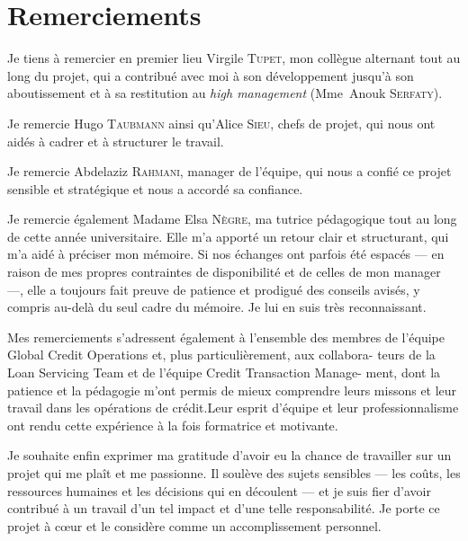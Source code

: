 \section*{Remerciements}

Je tiens à remercier en premier lieu Virgile \textsc{Tupet}, mon collègue
alternant tout au long du projet, qui a contribué avec moi à son développement
jusqu'à son aboutissement et à sa restitution au \textit{high management}
(Mme~Anouk \textsc{Serfaty}).

\bigskip

Je remercie Hugo \textsc{Taubmann} ainsi qu'Alice \textsc{Sieu}, chefs de projet,
qui nous ont aidés à cadrer et à structurer le travail.

\bigskip


Je remercie Abdelaziz \textsc{Rahmani}, manager de l'équipe, qui nous a
confié ce projet sensible et stratégique et nous a accordé sa confiance.

\bigskip

Je remercie également Madame Elsa \textsc{Nègre}, ma tutrice pédagogique tout au
long de cette année universitaire. Elle m'a apporté un retour clair et
structurant, qui m'a aidé à préciser mon mémoire. Si nos échanges ont parfois été
espacés --- en raison de mes propres contraintes de disponibilité et de celles de
mon manager ---, elle a toujours fait preuve de patience et prodigué des conseils
avisés, y compris au-delà du seul cadre du mémoire. Je lui en suis très
reconnaissant.

\bigskip

Mes remerciements s'adressent également à l'ensemble des membres de
l'équipe Global Credit Operations et, plus particulièrement, aux collabora-
teurs de la Loan Servicing Team et de l'équipe Credit Transaction Manage-
ment, dont la patience et la pédagogie m'ont permis de mieux comprendre
leurs missons et leur travail dans les opérations de crédit.Leur esprit d'équipe
et leur professionnalisme ont rendu cette expérience à la fois formatrice et
motivante.

\bigskip

Je souhaite enfin exprimer ma gratitude d'avoir eu la chance de travailler sur un
projet qui me plaît et me passionne. Il soulève des sujets sensibles --- les coûts,
les ressources humaines et les décisions qui en découlent --- et je suis fier
d'avoir contribué à un travail d'un tel impact et d'une telle responsabilité. Je
porte ce projet à cœur et le considère comme un accomplissement personnel.
